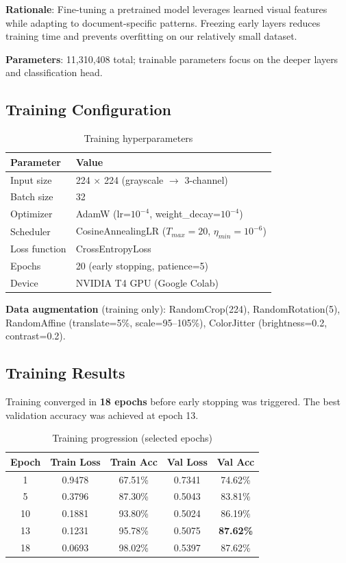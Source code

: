 \documentclass[12pt,a4paper]{article}
\begin{document}
\textbf{Rationale}: Fine-tuning a pretrained model leverages learned visual features while adapting to document-specific patterns. Freezing early layers reduces training time and prevents overfitting on our relatively small dataset.

\textbf{Parameters}: 11,310,408 total; trainable parameters focus on the deeper layers and classification head.

\subsection{Training Configuration}

\begin{table}[H]
\centering
\caption{Training hyperparameters}
\begin{tabular}{@{}ll@{}}
\toprule
\textbf{Parameter} & \textbf{Value} \\
\midrule
Input size & 224 $\times$ 224 (grayscale $\rightarrow$ 3-channel) \\
Batch size & 32 \\
Optimizer & AdamW (lr=$10^{-4}$, weight\_decay=$10^{-4}$) \\
Scheduler & CosineAnnealingLR ($T_{max}=20$, $\eta_{min}=10^{-6}$) \\
Loss function & CrossEntropyLoss \\
Epochs & 20 (early stopping, patience=5) \\
Device & NVIDIA T4 GPU (Google Colab) \\
\bottomrule
\end{tabular}
\end{table}

\textbf{Data augmentation} (training only): RandomCrop(224), RandomRotation(5\textdegree), RandomAffine (translate=5\%, scale=95--105\%), ColorJitter (brightness=0.2, contrast=0.2).

\subsection{Training Results}
Training converged in \textbf{18 epochs} before early stopping was triggered. The best validation accuracy was achieved at epoch 13.

\begin{table}[H]
\centering
\caption{Training progression (selected epochs)}
\begin{tabular}{@{}ccccc@{}}
\toprule
\textbf{Epoch} & \textbf{Train Loss} & \textbf{Train Acc} & \textbf{Val Loss} & \textbf{Val Acc} \\
\midrule
1  & 0.9478 & 67.51\% & 0.7341 & 74.62\% \\
5  & 0.3796 & 87.30\% & 0.5043 & 83.81\% \\
10 & 0.1881 & 93.80\% & 0.5024 & 86.19\% \\
13 & 0.1231 & 95.78\% & 0.5075 & \textbf{87.62\%} \\
18 & 0.0693 & 98.02\% & 0.5397 & 87.62\% \\
\bottomrule
\end{tabular}
\end{table}
\end{document}
